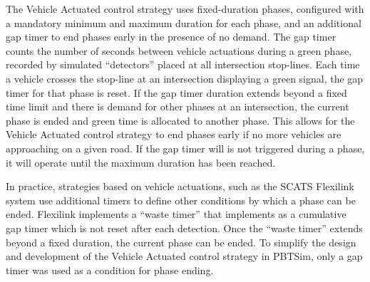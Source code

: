 The Vehicle Actuated control strategy uses fixed-duration phases, configured with a mandatory minimum and maximum duration for each phase, and an additional gap timer to end phases early in the presence of no demand. The gap timer counts the number of seconds between vehicle actuations during a green phase, recorded by simulated ``detectors'' placed at all intersection stop-lines. Each time a vehicle crosses the stop-line at an intersection displaying a green signal, the gap timer for that phase is reset. If the gap timer duration extends beyond a fixed time limit and there is demand for other phases at an intersection, the current phase is ended and green time is allocated to another phase. This allows for the Vehicle Actuated control strategy to end phases early if no more vehicles are approaching on a given road. If the gap timer will is not triggered during a phase, it will operate until the maximum duration has been reached.

In practice, strategies based on vehicle actuations, such as the SCATS Flexilink system use additional timers to define other conditions by which a phase can be ended. Flexilink implements a ``waste timer'' that implements as a cumulative gap timer which is not reset after each detection. Once the ``waste timer'' extends beyond a fixed duration, the current phase can be ended. To simplify the design and development of the Vehicle Actuated control strategy in PBTSim, only a gap timer was used as a condition for phase ending.  


